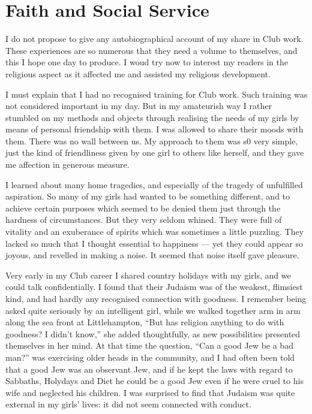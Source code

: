 \chapter{Faith and Social Service}

I do not propose to give any autobiographical
account of my share in Club work. These experiences are
so numerous that they need a volume to themselves,
and this I hope one day to produce. I woud try
now to interest my readers in the religious aspect as it
affected me and assisted my religious development.

I must explain that I had no recognised training for
Club work. Such training was not considered important
in my day. But in my amateurish way I rather stumbled
on my methods and objects through realising the needs
of my girls by means of personal friendship with them.
I was allowed to share their moods with them. There was
no wall between us. My approach to them was s0 very
simple, just the kind of friendliness given by one girl to
others like herself, and they gave me affection in generous
measure.

I learned about many home tragedies, and especially
of the tragedy of unfulfilled aspiration. So many of my
girls had wanted to be something different, and to achieve
certain purposes which seemed to be denied them just
through the hardness of circumstances. But they very
seldom whined. They were full of vitality and an
exuberance of spirits which was sometimes a little
puzzling. They lacked so much that I thought essential
to happiness — yet they could appear so joyous, and
revelled in making a noise. It seemed that noise itself
gave pleasure.

Very early in my Club career I shared country
holidays with my girls, and we could talk confidentially.
I found that their Judaism was of the weakest, flimsiest
kind, and had hardly any recognised connection with
goodness. I remember being asked quite seriously by an
intelligent girl, while we walked together arm in arm
along the sea front at Littlehampton, “But has religion
anything to do with goodness? I didn’t know,” she
added thoughtfully, as new possibilities presented
themselves in her mind. At that time the question,
“Can a good Jew be a bad man?” was exercising older
heads in the community, and I had often been told that
a good Jew was an observant Jew, and if he kept
the laws with regard to Sabbaths, Holydays and Diet
he could be a good Jew even if he were cruel to his
wife and neglected his children. I was surprised to find
that Judaism was quite external in my girls’ lives:
it did not seem connected with conduct.

